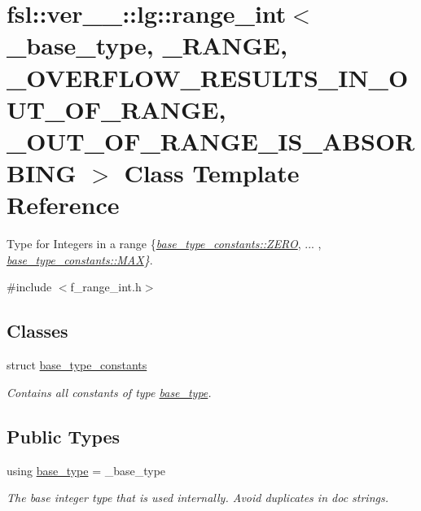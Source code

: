 \hypertarget{classfsl_1_1ver__1__0_1_1lg_1_1range__int}{}\section{fsl\+::ver\+\_\+\_\+::lg\+::range\+\_\+int$<$ \+\_\+base\+\_\+type, \+\_\+\+R\+A\+N\+GE, \+\_\+\+O\+V\+E\+R\+F\+L\+O\+W\+\_\+\+R\+E\+S\+U\+L\+T\+S\+\_\+\+I\+N\+\_\+\+O\+U\+T\+\_\+\+O\+F\+\_\+\+R\+A\+N\+GE, \+\_\+\+O\+U\+T\+\_\+\+O\+F\+\_\+\+R\+A\+N\+G\+E\+\_\+\+I\+S\+\_\+\+A\+B\+S\+O\+R\+B\+I\+NG $>$ Class Template Reference}
\label{classfsl_1_1ver__1__0_1_1lg_1_1range__int}


Type for Integers in a range \{{\itshape \mbox{\hyperlink{structfsl_1_1ver__1__0_1_1lg_1_1range__int_1_1base__type__constants_ada13cd01546095bb61095888cd0ab41d}{base\+\_\+type\+\_\+constants\+::\+Z\+E\+RO}}}, ... , {\itshape \mbox{\hyperlink{structfsl_1_1ver__1__0_1_1lg_1_1range__int_1_1base__type__constants_ae6291d70cbe40dbc429eba9cc4db9d27}{base\+\_\+type\+\_\+constants\+::\+M\+AX}}\}}.  




{\ttfamily \#include $<$f\+\_\+range\+\_\+int.\+h$>$}

\subsection*{Classes}
\begin{DoxyCompactItemize}
\item 
struct \mbox{\hyperlink{structfsl_1_1ver__1__0_1_1lg_1_1range__int_1_1base__type__constants}{base\+\_\+type\+\_\+constants}}
\begin{DoxyCompactList}\small\item\em Contains all constants of type \mbox{\hyperlink{classfsl_1_1ver__1__0_1_1lg_1_1range__int_aa6c763f6d72d18c8b9129c0c06628cd3}{base\+\_\+type}}. \end{DoxyCompactList}\end{DoxyCompactItemize}
\subsection*{Public Types}
\begin{DoxyCompactItemize}
\item 
\mbox{\label{classfsl_1_1ver__1__0_1_1lg_1_1range__int_aa6c763f6d72d18c8b9129c0c06628cd3}} 
using \mbox{\hyperlink{classfsl_1_1ver__1__0_1_1lg_1_1range__int_aa6c763f6d72d18c8b9129c0c06628cd3}{base\+\_\+type}} = \+\_\+base\+\_\+type
\begin{DoxyCompactList}\small\item\em The base integer type that is used internally. Avoid duplicates in doc strings. \end{DoxyCompactList}\end{DoxyCompactItemize}
